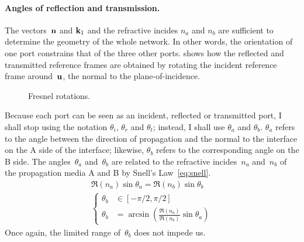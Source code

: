 \paragraph{Angles of reflection and transmission.}
The vectors~$\textbf{n}$ and $\textbf{k}_1$ and the refractive incides $n_a$ and $n_b$ are sufficient to determine the geometry of the whole network.
In other words, the orientation of one port constrains that of the three other ports.
 shows how the reflected and transmitted reference frames are obtained by rotating the incident reference frame around~$\textbf{u}$, the normal to the plane-of-incidence.
\begin{figure}[hbtp]
    \centering
    \caption{\label{fig:fresnel_rotations}Fresnel rotations.}
\end{figure}
Because each port can be seen as an incident, reflected or transmitted port, I shall stop using the notation $\theta_i$, $\theta_r$ and $\theta_t$;
instead, I shall use $\theta_a$ and $\theta_b$.
$\theta_a$ refers to the angle between the direction of propagation and the normal to the interface on the A side of the interface;
likewise, $\theta_b$ refers to the corresponding angle on the B side.
The angles~$\theta_a$ and~$\theta_b$ are related to the refractive incides~$n_a$ and~$n_b$ of the propagation media A and B by Snell's Law~\eqref{eq:snell}.
\begin{gather}
    \Re(n_a) \sin \theta_a = \Re(n_b) \sin \theta_b
    \label{eq:snell}
    \\
    \left\lbrace
        \begin{aligned}
            \theta_b &\in [-\pi/2, \pi/2]
            \\
            \theta_b &= \arcsin
            \left(
                \frac{\Re(n_a)}{\Re(n_b)}
                \sin \theta_a
            \right)
        \end{aligned}
    \right.
    \label{eq:snell_thetab}
\end{gather}
Once again, the limited range of~$\theta_b$ does not impede us.

